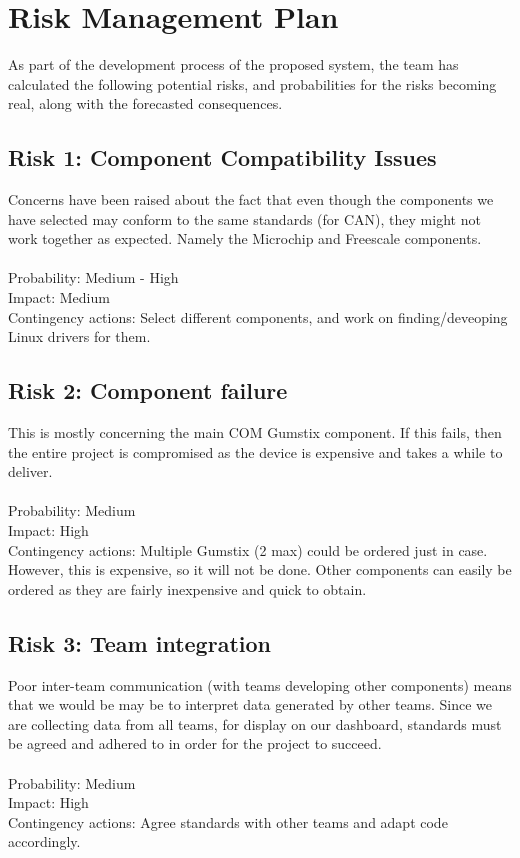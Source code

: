 \documentclass{article}
\begin{document}
\section{Risk Management Plan}
As part of the development process of the proposed system, the team has 
calculated the following potential risks, and probabilities for the risks 
becoming real, along with the forecasted consequences.

\subsection{Risk 1: Component Compatibility Issues}
Concerns have been raised about the fact that even though the components we 
have selected may conform to the same standards (for CAN), they might not work 
together as expected. Namely the Microchip and Freescale components.\\
\\
Probability: Medium - High\\
Impact: Medium\\
Contingency actions: Select different components, and work on 
finding/deveoping Linux drivers for them.

\subsection{Risk 2: Component failure}
This is mostly concerning the main COM Gumstix component. If this fails, then 
the entire project is compromised as the device is expensive and takes a while 
to deliver.\\
\\
Probability: Medium\\
Impact: High\\
Contingency actions: Multiple Gumstix (2 max) could be ordered just in case. 
However, this is expensive, so it will not be done. Other components can easily 
be ordered as they are fairly inexpensive and quick to obtain. 

\subsection{Risk 3: Team integration}
Poor inter-team communication (with teams developing other components) means 
that we would be may be to interpret data generated by other teams. Since we 
are collecting data from all teams, for display on our dashboard, standards 
must be agreed and adhered to in order for the project to succeed.\\
\\
Probability: Medium\\
Impact: High\\
Contingency actions: Agree standards with other teams and adapt code accordingly.
\end{document}
